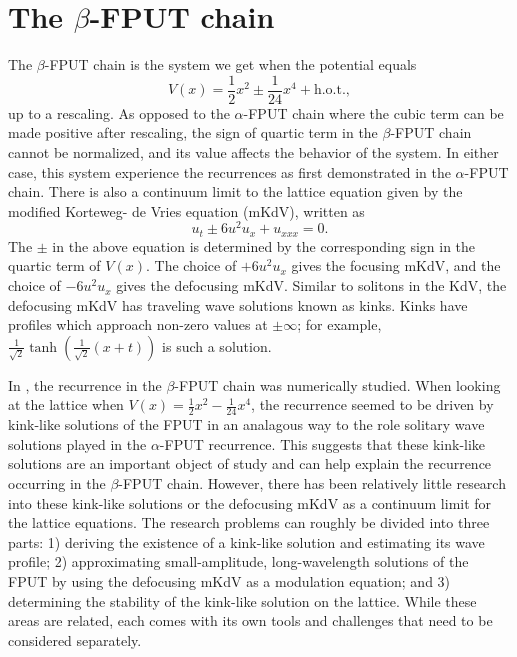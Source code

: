 \section{The \(\beta\)-FPUT chain}

The \(\beta\)-FPUT chain is the system we get when the potential equals
\begin{equation}
	V(x) = \frac 12 x^2 \pm \frac 1 {24}x^4 + \text{h.o.t.},
\end{equation}
up to a rescaling. As opposed to the \(\alpha\)-FPUT chain where the cubic term can be made positive after rescaling, the sign of quartic term in the \(\beta\)-FPUT chain cannot be normalized, and its value affects the behavior of the system. In either case, this system  experience the recurrences as first demonstrated in the \(\alpha\)-FPUT chain. There is also a continuum limit to the lattice equation given by the modified Korteweg- de Vries equation (mKdV), written as
\begin{equation}
	u_t \pm 6 u^2 u_x + u_{xxx} = 0.
\end{equation}
The \(\pm\) in the above equation is determined by the corresponding sign in the quartic term of \(V(x)\). The choice of \(+6u^2u_x\) gives the focusing mKdV, and the choice of \(-6u^2u_x\) gives the defocusing mKdV. Similar to solitons in the KdV, the defocusing mKdV has traveling wave solutions known as kinks. Kinks have profiles which approach non-zero values at \(\pm \infty\); for example, \(\frac 1 {\sqrt 2} \tanh(\frac 1 {\sqrt 2} (x+t))\) is such a solution.

In \cite{pace2019beta}, the recurrence in the \(\beta\)-FPUT chain was numerically studied. When looking at the lattice when \(V(x) = \frac  12 x^2 - \frac 1 {24}x^4\), the recurrence seemed to be driven by kink-like solutions of the FPUT in an analagous way to the role solitary wave solutions played in the \(\alpha\)-FPUT recurrence. This suggests that these kink-like solutions are an important object of study and can help explain the recurrence occurring in the \(\beta\)-FPUT chain. However, there has been relatively little research into these kink-like solutions or the defocusing mKdV as a continuum limit for the lattice equations. The research problems can roughly be divided into three parts: 1) deriving the existence of a kink-like solution and estimating its wave profile; 2) approximating small-amplitude, long-wavelength solutions of the FPUT by using the defocusing mKdV as a modulation equation; and 3) determining the stability of the kink-like solution on the lattice. While these areas are related, each comes with its own tools and challenges that need to be considered separately. 


